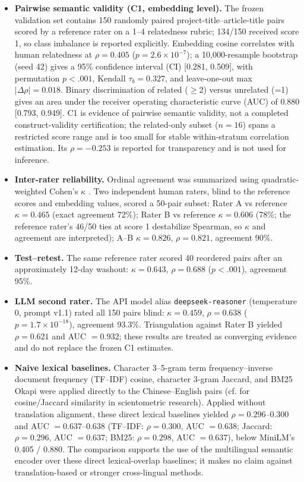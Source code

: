 \documentclass[11pt]{article}
\begin{document}
\begin{itemize}
\item \textbf{Pairwise semantic validity (C1, embedding level).} The frozen validation set contains 150 randomly paired project-title--article-title pairs scored by a reference rater on a 1--4 relatedness rubric; 134/150 received score 1, so class imbalance is reported explicitly. Embedding cosine correlates with human relatedness at $\rho=0.405$ ($p=2.6\times10^{-7}$); a 10,000-resample bootstrap (seed 42) gives a 95\% confidence interval (CI) [0.281, 0.509], with permutation $p<.001$, Kendall $\tau_b=0.327$, and leave-one-out max $|\Delta\rho|=0.018$. Binary discrimination of related ($\ge2$) versus unrelated (=1) gives an area under the receiver operating characteristic curve (AUC) of 0.880 [0.793, 0.949]. C1 is evidence of pairwise semantic validity, not a completed construct-validity certification; the related-only subset ($n=16$) spans a restricted score range and is too small for stable within-stratum correlation estimation. Its $\rho=-0.253$ is reported for transparency and is not used for inference.

\item \textbf{Inter-rater reliability.} Ordinal agreement was summarized using quadratic-weighted Cohen's $\kappa$ \citep{cohen1968weighted}. Two independent human raters, blind to the reference scores and embedding values, scored a 50-pair subset: Rater A vs reference $\kappa=0.465$ (exact agreement 72\%); Rater B vs reference $\kappa=0.606$ (78\%; the reference rater's 46/50 ties at score 1 destabilize Spearman, so $\kappa$ and agreement are interpreted); A--B $\kappa=0.826$, $\rho=0.821$, agreement 90\%.

\item \textbf{Test--retest.} The same reference rater scored 40 reordered pairs after an approximately 12-day washout: $\kappa=0.643$, $\rho=0.688$ ($p<.001$), agreement 95\%.

\item \textbf{LLM second rater.} The API model alias \texttt{deepseek-reasoner} (temperature 0, prompt v1.1) rated all 150 pairs blind: $\kappa=0.459$, $\rho=0.638$ ($p=1.7\times10^{-18}$), agreement 93.3\%. Triangulation against Rater B yielded $\rho=0.621$ and AUC $=0.932$; these results are treated as converging evidence and do not replace the frozen C1 estimates.

\item \textbf{Naive lexical baselines.} Character 3--5-gram term frequency--inverse document frequency (TF--IDF) cosine, character 3-gram Jaccard, and BM25 Okapi \citep{robertson2009bm25} were applied directly to the Chinese--English pairs (cf. \citealp{hamers1989similarity} for cosine/Jaccard similarity in scientometric research). Applied without translation alignment, these direct lexical baselines yielded $\rho=0.296$--$0.300$ and AUC $=0.637$--$0.638$ (TF--IDF: $\rho=0.300$, AUC $=0.638$; Jaccard: $\rho=0.296$, AUC $=0.637$; BM25: $\rho=0.298$, AUC $=0.637$), below MiniLM's 0.405 / 0.880. The comparison supports the use of the multilingual semantic encoder over these direct lexical-overlap baselines; it makes no claim against translation-based or stronger cross-lingual methods.


\end{itemize}
\end{document}
